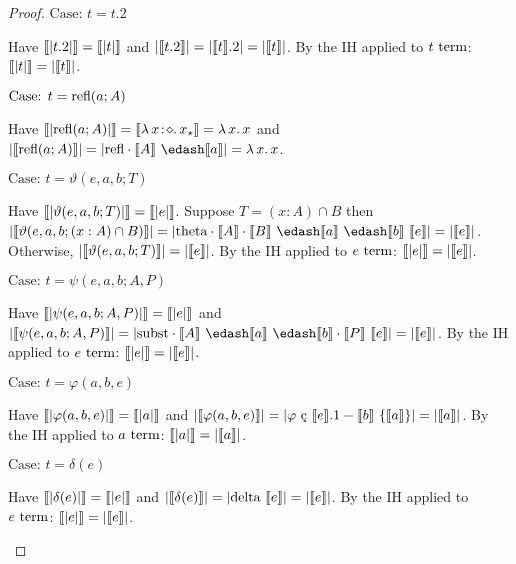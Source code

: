\begin{proof}
    $\text{Case: }t = t.2$
    \begin{proofcase}
        Have $\llbracket |t.2| \rrbracket = \llbracket |t| \rrbracket$ and $|\llbracket t.2 \rrbracket| = |\llbracket t \rrbracket.2| = |\llbracket t \rrbracket|$.
        By the IH applied to $t~\textnormal{term}$: $\llbracket |t| \rrbracket = |\llbracket t \rrbracket|$.
    \end{proofcase}

    $\text{Case: }t = \textnormal{refl}(a; A)$
    \begin{proofcase}
        Have $\llbracket |\textnormal{refl}(a; A)| \rrbracket = \llbracket {\lambda}\, x\! : \! \diamond.\, x_\star \rrbracket = {\lambda}\, x.\, x$ and $|\sema{\prefl(a; A)}| = |\crefl \cdot \sema{A}\ \edash \sema{a}| = \absu{\lambda}{x}{x}$.
    \end{proofcase}

    $\text{Case: }t = \vartheta(e, a, b; T)$
    \begin{proofcase}
        Have $\llbracket |\vartheta(e, a, b; T)| \rrbracket = \llbracket |e| \rrbracket$.
        Suppose $T = (x : A) \cap B$ then $|\sema{\vartheta(e, a, b; (x : A) \cap B)}| = |\ctheta \cdot \sema{A} \cdot \sema{B}\ \edash \sema{a}\ \edash \sema{b}\ \sema{e}| = |\sema{e}|$.
        Otherwise, $|\llbracket \vartheta(e, a, b; T) \rrbracket| = |\llbracket e \rrbracket|$.
        By the IH applied to $e~\textnormal{term}$: $\llbracket |e| \rrbracket = |\llbracket e \rrbracket|$.
    \end{proofcase}

    $\text{Case: }t = \psi(e, a, b; A, P)$
    \begin{proofcase}
        Have $\llbracket |\psi(e, a, b; A, P)| \rrbracket = \llbracket |e| \rrbracket$ and $|\sema{\psi(e, a, b; A, P)}| = |\csubst \cdot \sema{A}\ \edash \sema{a}\ \edash \sema{b} \cdot \sema{P}\ \sema{e}| = |\sema{e}|$.
        By the IH applied to $e~\textnormal{term}$: $\llbracket |e| \rrbracket = |\llbracket e \rrbracket|$.
    \end{proofcase}

    $\text{Case: }t = \varphi(a, b, e)$
    \begin{proofcase}
        Have $\llbracket |\varphi(a, b, e)| \rrbracket = \llbracket |a| \rrbracket$ and $|\sema{\varphi(a, b, e)}| = |\varphi\ \text{\c{c}}\ \sema{e}.1 - \sema{b}\ \{ \sema{a} \}| = |\sema{a}|$.
        By the IH applied to $a~\textnormal{term}$: $\llbracket |a| \rrbracket = |\llbracket a \rrbracket|$.
    \end{proofcase}

    $\text{Case: }t = \delta(e)$
    \begin{proofcase}
        Have $\llbracket |\delta(e)| \rrbracket = \llbracket |e| \rrbracket$ and $|\llbracket \delta(e) \rrbracket| = |\textnormal{delta}\ \llbracket e \rrbracket| = |\llbracket e \rrbracket|$.
        By the IH applied to $e~\textnormal{term}$: $\llbracket |e| \rrbracket = |\llbracket e \rrbracket|$.
    \end{proofcase}
\end{proof}


